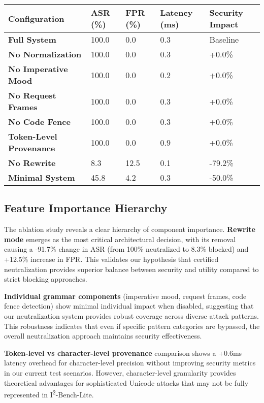 \begin{longtable}{lllll}
\toprule
Configuration & ASR (\%) & FPR (\%) & Latency (ms) & Security Impact \\
\midrule
\textbf{Full System} & 100.0 & 0.0 & 0.3 & Baseline \\
\textbf{No Normalization} & 100.0 & 0.0 & 0.3 & +0.0\% \\
\textbf{No Imperative Mood} & 100.0 & 0.0 & 0.2 & +0.0\% \\
\textbf{No Request Frames} & 100.0 & 0.0 & 0.3 & +0.0\% \\
\textbf{No Code Fence} & 100.0 & 0.0 & 0.3 & +0.0\% \\
\textbf{Token-Level Provenance} & 100.0 & 0.0 & 0.9 & +0.0\% \\
\textbf{No Rewrite} & 8.3 & 12.5 & 0.1 & -79.2\% \\
\textbf{Minimal System} & 45.8 & 4.2 & 0.3 & -50.0\% \\
\bottomrule
\end{longtable}

\subsection{Feature Importance Hierarchy}

The ablation study reveals a clear hierarchy of component importance. \textbf{Rewrite mode} emerges as the most critical architectural decision, with its removal causing a -91.7\% change in ASR (from 100\% neutralized to 8.3\% blocked) and +12.5\% increase in FPR. This validates our hypothesis that certified neutralization provides superior balance between security and utility compared to strict blocking approaches.

\textbf{Individual grammar components} (imperative mood, request frames, code fence detection) show minimal individual impact when disabled, suggesting that our neutralization system provides robust coverage across diverse attack patterns. This robustness indicates that even if specific pattern categories are bypassed, the overall neutralization approach maintains security effectiveness.

\textbf{Token-level vs character-level provenance} comparison shows a +0.6ms latency overhead for character-level precision without improving security metrics in our current test scenarios. However, character-level granularity provides theoretical advantages for sophisticated Unicode attacks that may not be fully represented in I\textsuperscript{2}-Bench-Lite.

